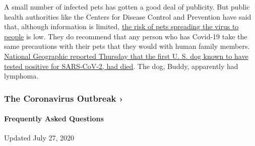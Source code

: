 A small number of infected pets has gotten a good deal of publicity. But
public health authorities like the Centers for Disease Control and
Prevention have said that, although information is limited,
\href{https://www.cdc.gov/coronavirus/2019-ncov/daily-life-coping/pets.html}{the
risk of pets spreading the virus to people} is low. They do recommend
that any person who has Covid-19 take the same precautions with their
pets that they would with human family members.
\href{https://www.nationalgeographic.com/animals/2020/07/first-dog-to-test-positive-for-covid-in-us-dies/}{National
Geographic reported Thursday that the first U. S. dog known to have
tested positive for SARS-CoV-2, had died}. The dog, Buddy, apparently
had lymphoma.

\href{https://www.nytimes.com/news-event/coronavirus?action=click\&pgtype=Article\&state=default\&region=MAIN_CONTENT_3\&context=storylines_faq}{}

\hypertarget{the-coronavirus-outbreak-}{%
\subsubsection{The Coronavirus Outbreak
›}\label{the-coronavirus-outbreak-}}

\hypertarget{frequently-asked-questions}{%
\paragraph{Frequently Asked
Questions}\label{frequently-asked-questions}}

Updated July 27, 2020

